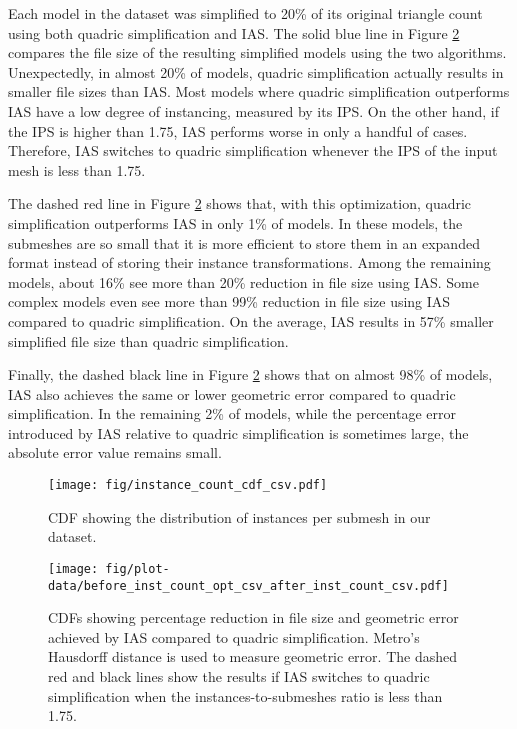 Each model in the dataset was simplified to 20\% of its original triangle
count using both quadric simplification and IAS.
The solid blue line in Figure \ref{fig:ias_filesize_reduction} compares the file size
of the resulting simplified models using the two algorithms. 
Unexpectedly, in almost 20\% of models, quadric simplification actually
results in smaller file sizes than IAS. Most models where quadric 
simplification outperforms IAS have a low degree of instancing,
measured by its IPS. On the other hand, if the IPS is higher than 1.75, 
IAS performs worse in only a handful of cases. 
Therefore, IAS switches to quadric simplification
whenever the IPS of the input mesh is less than 1.75. 

The dashed red line in Figure \ref{fig:ias_filesize_reduction} shows that, with this optimization, 
quadric simplification outperforms IAS in only 1\% of models. 
In these models, the submeshes are so small that it is more
efficient to store them in an expanded format instead of storing their instance
transformations. Among the remaining models, about 16\% see more than
20\% reduction in file size using IAS. Some complex models even see more than 99\%
reduction in file size using IAS compared to quadric simplification. 
On the average, IAS results in 57\% smaller simplified file size than quadric 
simplification.

Finally, the dashed black line in Figure \ref{fig:ias_filesize_reduction} shows that on almost 98\%
of models, IAS also achieves the same or lower geometric error compared to quadric simplification. 
In the remaining 2\% of models, while the percentage error introduced by IAS relative to quadric 
simplification is sometimes large, the absolute error value remains small.

\begin{figure}
\centering

\texttt{[image: fig/instance\_count\_cdf\_csv.pdf]}
\caption{CDF showing the distribution of instances per submesh in our dataset.}
\label{fig:ips_meshes}
\vspace{-8pt}
\end{figure}

\begin{figure}
\texttt{[image: fig/plot-data/before\_inst\_count\_opt\_csv\_after\_inst\_count\_csv.pdf]}

\caption{CDFs showing percentage reduction in file size and geometric error achieved by IAS compared to
quadric simplification. Metro's Hausdorff distance is used to measure geometric error.
The dashed red and black lines show the results
if IAS switches to quadric simplification when the instances-to-submeshes ratio is
less than 1.75.} 
\label{fig:ias_filesize_reduction}
\vspace{-10pt}

\end{figure}


